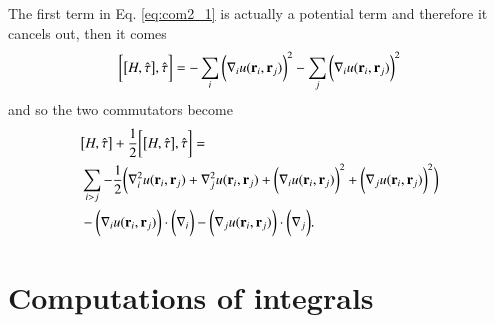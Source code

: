 \documentclass[aip,jcp,reprint,noshowkeys,superscriptaddress]{revtex4-1}
\newcommand{\br}[0]{{\bf {r}}}
\begin{document}
The first term in Eq. \eqref{eq:com2_1} is actually a potential term and therefore it cancels out, then it comes
\begin{equation}
 \label{eq:com2_2}
 \begin{aligned}
  \bigg[ \big[H,\hat{\tau}\big],\hat{\tau}\bigg] = -\sum_i \bigg( \nabla_i u(\br{}_i,\br{}_j) \bigg)^2 - \sum_j \bigg( \nabla_i u(\br{}_i,\br{}_j) \bigg)^2 
 \end{aligned}
\end{equation}
and so the two commutators become
\begin{equation}
 \begin{aligned}
 \label{eq:comtot}
& \big[ H,\hat{\tau} \big] + \frac{1}{2} \bigg[ \big[H,\hat{\tau}\big],\hat{\tau}\bigg] = \\
   &\sum_{i>j} -\frac{1}{2} \bigg( \nabla^2_i u(\br{}_i,\br{}_j) +  \nabla^2_j u(\br{}_i,\br{}_j) 
    + \bigg( \nabla_i u(\br{}_i,\br{}_j) \bigg)^2 + \bigg( \nabla_j u(\br{}_i, \br{}_j) \bigg)^2  \bigg) \\
   & -\bigg(\nabla_i u(\br{}_i,\br{}_j)\bigg) \cdot \bigg( \nabla_i  \bigg) -\bigg(\nabla_j u(\br{}_i,\br{}_j)\bigg) \cdot \bigg( \nabla_j  \bigg). 
 \end{aligned}
\end{equation}

\section{Computations of integrals}
\end{document}
